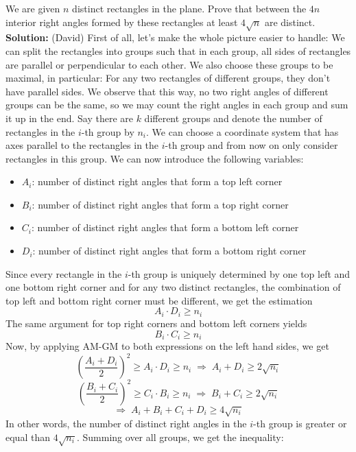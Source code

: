 We are given $n$ distinct rectangles in the plane. Prove that between the $4n$ interior right angles formed by these rectangles at least $4\sqrt{n}$ are distinct.
\newline
\newline
\textbf{Solution:} (David)
First of all, let's make the whole picture easier to handle: We can split the rectangles into groups such that in each group, all sides of rectangles are parallel or perpendicular to each other. We also choose these groups to be maximal, in particular: For any two rectangles of different groups, they don't have parallel sides. We observe that this way, no two right angles of different groups can be the same, so we may count the right angles in each group and sum it up in the end. Say there are $k$ different groups and denote the number of rectangles in the $i$-th group by $n_i$. We can choose a coordinate system that has axes parallel to the rectangles in the $i$-th group and from now on only consider rectangles in this group. \newline
\newline
We can now introduce the following variables:
\begin{itemize}
\item $A_i$: number of distinct right angles that form a top left corner
\item $B_i$: number of distinct right angles that form a top right corner
\item $C_i$: number of distinct right angles that form a bottom left corner
\item $D_i$: number of distinct right angles that form a bottom right corner
\end{itemize}
Since every rectangle in the $i$-th group is uniquely determined by one top left and one bottom right corner and for any two distinct rectangles, the combination of top left and bottom right corner must be different, we get the estimation \[
A_i \cdot D_i \geq n_i
\]
The same argument for top right corners and bottom left corners yields
\[
B_i \cdot C_i \geq n_i
\]
Now, by applying AM-GM to both expressions on the left hand sides, we get
\[
\left( \frac{A_i+D_i}{2} \right)^2 \geq A_i \cdot D_i \geq n_i \; \Rightarrow \; A_i + D_i \geq 2\sqrt{n_i}
\]
\[
\left( \frac{B_i+C_i}{2} \right) ^2 \geq C_i \cdot B_i \geq n_i \; \Rightarrow \; B_i + C_i \geq 2\sqrt{n_i}
\]
\[
\Rightarrow \; A_i + B_i + C_i + D_i \geq 4\sqrt{n_i}
\]
In other words, the number of distinct right angles in the $i$-th group is greater or equal than $4\sqrt{n_i}$. Summing over all groups, we get the inequality:

